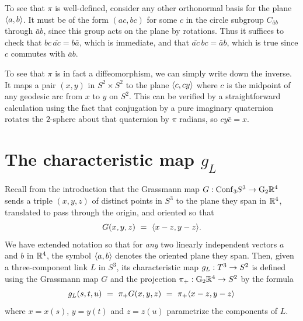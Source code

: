 To see that $\pi$ is well-defined, consider any other orthonormal basis for the plane $\langle a,b\rangle$.  It must be of the form $(ac,bc)$ for some $c$ in the circle subgroup $C_{\bar ab}$ through $\bar ab$, since this group acts on the plane by rotations.   Thus it suffices to check that $bc\,\overline{ac} = b\bar a$, which is immediate, and that $\overline{ac}\, bc = \bar ab$, which is true since $c$ commutes with $\bar ab$.  

To see that $\pi$ is in fact a diffeomorphism, we can simply write down the inverse.  It maps a pair $(x,y)$ in $S^2\times S^2$ to the plane $\langle c,cy\rangle$ where $c$ is the midpoint of any geodesic arc from $x$ to $y$ on $S^2$.   This can be verified by a straightforward calculation using the fact that conjugation by a pure imaginary quaternion rotates the $2$-sphere about that quaternion by $\pi$ radians, so $cy\bar c = x$.

\part{The characteristic map $g_L$} 

Recall from the introduction that the Grassmann map $G:\mathrm{Conf}_{3}S^3\to\mathrm{G}_2\mathbb R^4$ sends a triple $(x,y,z)$ of distinct points in $S^3$ to the plane they span in $\mathbb R^4$, translated to pass through the origin, and oriented so that
$$
G(x,y,z) \ = \ \langle x-z,y-z\rangle.
$$  
We have extended notation so that for {\it any} two linearly independent vectors $a$ and $b$ in $\mathbb R^4$, the symbol $\langle a,b\rangle$ denotes the oriented plane they span.  Then, given a three-component link $L$ in $S^3$, its characteristic map $g_L:T^3\to S^2$ is defined using the Grassmann map $G$ and the projection $\pi_+:\mathrm{G}_2\mathbb R^4\to S^2$ by the formula 
$$
g_L(s,t,u) \ = \ \pi_+G(x,y,z) \ = \ \pi_+\pb{x-z}{y-z}
$$
where $x=x(s)$, $y=y(t)$ and $z=z(u)$ parametrize the components of $L$.   

